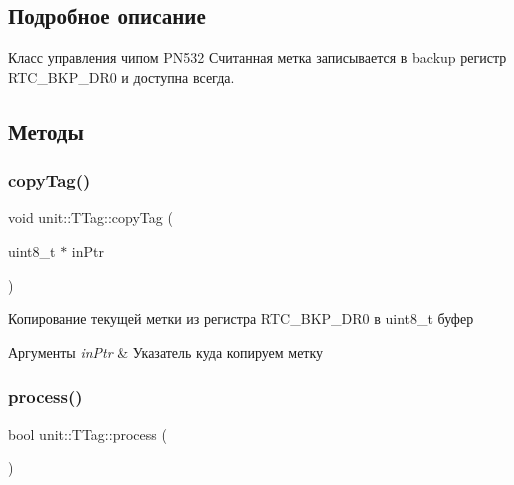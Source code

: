 \subsection{Подробное описание}
Класс управления чипом P\+N532 Считанная метка записывается в backup регистр R\+T\+C\+\_\+\+B\+K\+P\+\_\+\+D\+R0 и доступна всегда. 

\subsection{Методы}
\mbox{\label{classunit_1_1_t_tag_a90fba846800afa1b828d81f079ba735e}} 
\subsubsection{\texorpdfstring{copy\+Tag()}{copyTag()}}
{\footnotesize\ttfamily void unit\+::\+T\+Tag\+::copy\+Tag (\begin{DoxyParamCaption}\item[{uint8\+\_\+t $\ast$}]{in\+Ptr }\end{DoxyParamCaption})}



Копирование текущей метки из регистра R\+T\+C\+\_\+\+B\+K\+P\+\_\+\+D\+R0 в uint8\+\_\+t буфер 



 
\begin{DoxyParams}{Аргументы}
{\em in\+Ptr} & Указатель куда копируем метку \\
\hline
\end{DoxyParams}
\mbox{\label{classunit_1_1_t_tag_a1dfd588909730d0b48edbeda273526fe}} 
\subsubsection{\texorpdfstring{process()}{process()}}
{\footnotesize\ttfamily bool unit\+::\+T\+Tag\+::process (\begin{DoxyParamCaption}{ }\end{DoxyParamCaption})\hspace{0.3cm}{\ttfamily [virtual]}}



